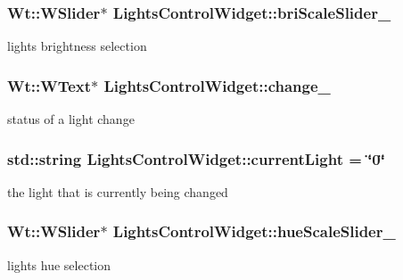 \subsubsection[{\texorpdfstring{bri\+Scale\+Slider\+\_\+}{briScaleSlider_}}]{\setlength{\rightskip}{0pt plus 5cm}Wt\+::\+W\+Slider$\ast$ Lights\+Control\+Widget\+::bri\+Scale\+Slider\+\_\+\hspace{0.3cm}{\ttfamily [private]}}\hypertarget{classLightsControlWidget_aafc30b2cc242d6ac2575128a491298d3}{}\label{classLightsControlWidget_aafc30b2cc242d6ac2575128a491298d3}
light\textquotesingle{}s brightness selection 
\subsubsection[{\texorpdfstring{change\+\_\+}{change_}}]{\setlength{\rightskip}{0pt plus 5cm}Wt\+::\+W\+Text$\ast$ Lights\+Control\+Widget\+::change\+\_\+\hspace{0.3cm}{\ttfamily [private]}}\hypertarget{classLightsControlWidget_a27b0c91e6a4776c8b03dfc5324e3e365}{}\label{classLightsControlWidget_a27b0c91e6a4776c8b03dfc5324e3e365}
status of a light change 
\subsubsection[{\texorpdfstring{current\+Light}{currentLight}}]{\setlength{\rightskip}{0pt plus 5cm}std\+::string Lights\+Control\+Widget\+::current\+Light = \char`\"{}0\char`\"{}\hspace{0.3cm}{\ttfamily [private]}}\hypertarget{classLightsControlWidget_ace513933420460bc8fbb508d865491d4}{}\label{classLightsControlWidget_ace513933420460bc8fbb508d865491d4}
the light that is currently being changed 
\subsubsection[{\texorpdfstring{hue\+Scale\+Slider\+\_\+}{hueScaleSlider_}}]{\setlength{\rightskip}{0pt plus 5cm}Wt\+::\+W\+Slider$\ast$ Lights\+Control\+Widget\+::hue\+Scale\+Slider\+\_\+\hspace{0.3cm}{\ttfamily [private]}}\hypertarget{classLightsControlWidget_a71c03598de2481409316e7d1ca51fda0}{}\label{classLightsControlWidget_a71c03598de2481409316e7d1ca51fda0}
light\textquotesingle{}s hue selection 

